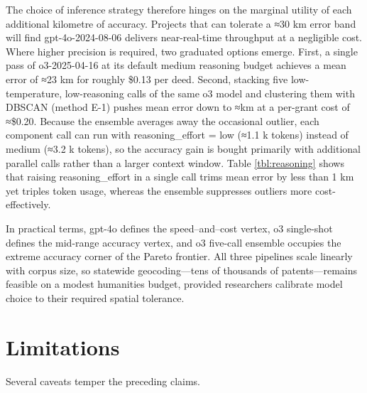 The choice of inference strategy therefore hinges on the marginal
utility of each additional kilometre of accuracy. Projects that can
tolerate a ≈30 km error band will find gpt-4o-2024-08-06 delivers
near-real-time throughput at a negligible cost. Where higher precision
is required, two graduated options emerge. First, a single pass of
o3-2025-04-16 at its default medium reasoning budget achieves a mean
error of ≈23 km for roughly \$0.13 per deed. Second, stacking five
low-temperature, low-reasoning calls of the same o3 model and clustering
them with DBSCAN (\DIFaddbegin {}\DIFaddend method E-1) pushes mean error down to
≈\DIFdelbegin {}\DIFdelend \DIFaddbegin {}\DIFaddend km at a per-grant cost of ≈\$0.20. Because the ensemble averages
away the occasional outlier, each component call can run with
reasoning\_effort = low (≈1.1 k tokens) instead of medium (≈3.2 k
tokens), so the accuracy gain is bought primarily with additional
parallel calls rather than a larger context window. Table
\ref{tbl:reasoning} shows that raising reasoning\_effort in a single
call trims mean error by less than 1 km yet triples token usage, whereas
the ensemble suppresses outliers more cost-effectively.

In practical terms, gpt-4o defines the speed--and--cost vertex, o3
single-shot defines the mid-range accuracy vertex, and o3 five-call
ensemble occupies the extreme accuracy corner of the Pareto frontier.
All three pipelines scale linearly with corpus size, so statewide
geocoding---tens of thousands of patents---remains feasible on a modest
humanities budget, provided researchers calibrate model choice to their
required spatial tolerance.

\section{Limitations}\label{limitations}

Several caveats temper the preceding claims.

